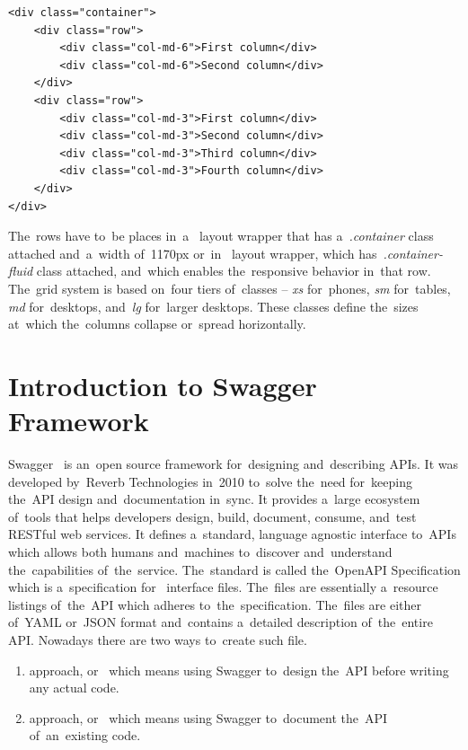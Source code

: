 \begin{lstlisting}[caption=An~illustration of~the~grid system in~PatternFly.,
label=lst-grid, style=dp-html]
<div class="container">
	<div class="row">
		<div class="col-md-6">First column</div>
		<div class="col-md-6">Second column</div>
	</div>
	<div class="row">
		<div class="col-md-3">First column</div>
		<div class="col-md-3">Second column</div>
		<div class="col-md-3">Third column</div>
		<div class="col-md-3">Fourth column</div>
	</div>
</div>
\end{lstlisting}

The~rows have to~be places in~a~ layout wrapper that has
a~\textit{.container} class attached and~a~width of~1170px or~in~
layout wrapper, which has~\textit{.container-fluid} class attached, and~which
enables the~responsive behavior in~that row. The~grid system is based on~four
tiers of~classes -- \textit{xs} for~phones, \textit{sm} for~tables, \textit{md}
for~desktops, and~\textit{lg} for~larger desktops. These classes define
the~sizes at~which the~columns collapse or~spread horizontally. 


\section{Introduction to Swagger Framework}
Swagger~\cite{Swagger} is an~open source framework for~designing and~describing
APIs. It was developed by~Reverb Technologies in~2010 to~solve the~need
for~keeping the~API design and~documentation in~sync. It provides a~large
ecosystem of~tools that helps developers design, build, document, consume,
and~test RESTful web services. It defines a~standard, language agnostic
interface to~APIs which allows both humans and~machines to~discover
and~understand the~capabilities of~the~service. The~standard is called
the~OpenAPI Specification which is a~specification for~
interface files. The~files are essentially a~resource listings of~the~API which
adheres to~the~specification. The~files are either of~YAML or~JSON format
and~contains a~detailed description of~the~entire API. Nowadays there are two
ways to~create such file.

\begin{enumerate}
  \item {} approach, or~ which means using Swagger
  to~design the~API before writing any actual code.
  \item {} approach, or~ which means using Swagger
  to~document the~API of~an~existing code.
\end{enumerate}


